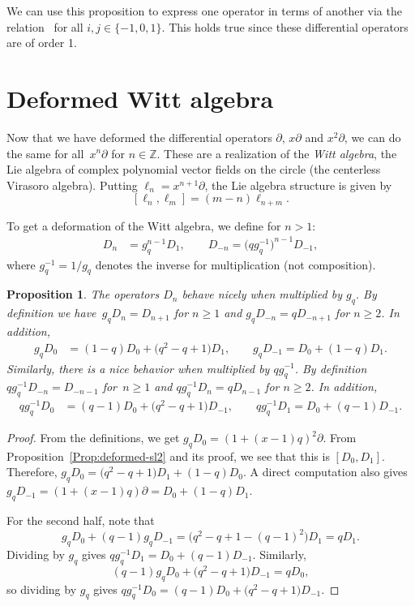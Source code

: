 \documentclass[10pt,a4paper]{amsart}
\numberwithin{equation}{section}
\newtheorem{Proposition}[Theorem]{Proposition}
 { \theoremstyle{definition}
\newtheorem{Definition}[Theorem]{Definition}
\newtheorem{Note}[Theorem]{Note}
\newtheorem{Example}[Theorem]{Example}
\newtheorem{Remark}[Theorem]{Remark} }
\newcommand*{\Z}{\mathbb{Z}}
\begin{document}
We can use this proposition to express one operator in terms of another via the relation~
for all $i,j\in \{-1,0,1\}$. This holds true since these differential operators are of order 1.


\section{Deformed Witt algebra}\label{Sec:Witt}

Now that we have deformed the differential operators $\partial$, $x\partial$ and $x^2\partial$, we can do the same for all~$x^n\partial$ for $n\in\Z$. These are a realization of the \emph{Witt algebra}, the Lie algebra of complex polynomial vector fields on the circle (the centerless Virasoro algebra). Putting $\ell_n=x^{n+1}\partial$, the Lie algebra structure is given by
\[\label{Eq-witt-algebra}
[\ell_n,\ell_m]=(m-n)\ell_{n+m}.
\]

To get a deformation of the Witt algebra, we define for $n>1$:
\begin{align*}
D_n &= g_q^{n-1}D_1, \qquad
D_{-n} = \big(qg_q^{-1}\big)^{n-1}D_{-1},
\end{align*}
where $g_q^{-1}=1/g_q$ denotes the inverse for multiplication (not composition).

\begin{Proposition}\label{Prop:mult-by-gq}
The operators $D_n$ behave nicely when multiplied by $g_q$. By definition we have~${g_qD_n=D_{n+1}}$ for $n\geq 1$ and $g_qD_{-n}=qD_{-n+1}$ for $n\geq 2$. In addition,
\begin{align*}
g_qD_0 &= (1-q)D_0+\big(q^2-q+1\big)D_1,\qquad
g_qD_{-1}= D_0+(1-q)D_1.
\end{align*}
Similarly, there is a nice behavior when multiplied by $qg_q^{-1}$. By definition $qg_q^{-1}D_{-n}=D_{-n-1}$ for~${n\geq 1}$ and $qg_q^{-1}D_n=qD_{n-1}$ for $n\geq 2$. In addition,
\begin{align*}
qg_q^{-1}D_0 &= (q-1)D_0+\big(q^2-q+1\big)D_{-1},\qquad
qg_q^{-1}D_{1}= D_0+(q-1)D_{-1}.
\end{align*}
\end{Proposition}
\begin{proof}
From the definitions, we get $g_qD_0=(1+(x-1)q)^2\partial$. From Proposition~\ref{Prop:deformed-sl2} and its proof, we see that this is $[D_0,D_1]$. Therefore, $g_qD_0=\big(q^2-q+1\big)D_1+(1-q)D_0$. A direct computation also gives $g_qD_{-1}=(1+(x-1)q)\partial=D_0+(1-q)D_1$.

For the second half, note that
\[
g_qD_0+(q-1)g_qD_{-1}=\big(q^2-q+1-(q-1)^2\big)D_1=qD_1.
\]
 Dividing by $g_q$ gives $qg_q^{-1}D_1=D_0+(q-1)D_{-1}$. Similarly,
 \[
 (q-1)g_qD_0+\big(q^2-q+1\big)D_{-1}=qD_0,\] so dividing by $g_q$ gives $qg_q^{-1}D_0=(q-1)D_0+\big(q^2-q+1\big)D_{-1}$.
\end{proof}
\end{document}
